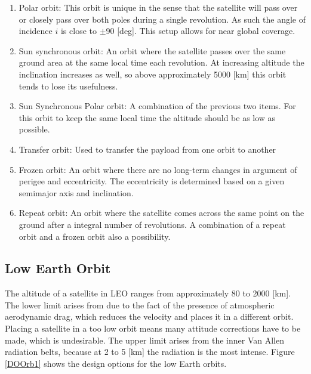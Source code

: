 \begin{enumerate}
	\item Polar orbit:
	This orbit is unique in the sense that the satellite will pass over or closely pass over both poles during a single revolution. As such the angle of incidence $i$ is close to  $\pm$90 [deg]. This setup allows for near global coverage.
	\item Sun synchronous orbit:
	An orbit where the satellite passes over the same ground area at the same local time each revolution. At increasing altitude the inclination increases as well, so above approximately 5000 [km]\cite{larson} this orbit tends to lose its usefulness. 
	\item Sun Synchronous Polar orbit:
	A combination of the previous two items. For this orbit to keep the same local time the altitude should be as low as possible.
	\item Transfer orbit:
	Used to transfer the payload from one orbit to another
	\item Frozen orbit:
	An orbit where there are no long-term changes in argument of perigee and eccentricity. The eccentricity is determined based on a given semimajor axis and inclination.
	\item Repeat orbit:
	An orbit where the satellite comes across the same point on the ground after a integral number of revolutions. A combination of a repeat orbit and a frozen orbit also a possibility.
\end{enumerate}

\subsection{Low Earth Orbit}
\label{sec:blOrb1}
The altitude of a satellite in \acs{LEO} ranges from approximately 80 to 2000 [km]\cite{nasaOrbit}. The lower limit arises from due to the fact of the presence of atmospheric aerodynamic drag, which reduces the velocity and places it in a different orbit. Placing a satellite in a too low orbit means many attitude corrections have to be made, which is undesirable. The upper limit arises from the inner Van Allen radiation belts, because at 2 to 5 [km]\cite{sse} the radiation is the most intense. Figure \ref{DOOrb1} shows the design options for the low Earth orbits.

